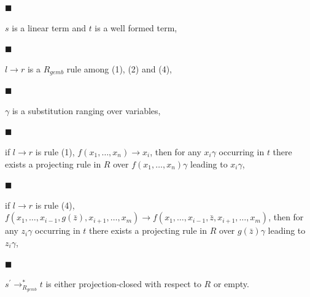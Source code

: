 \par\noindent  $\blacksquare$ 
 
$s$ is a linear term and $t$ is a well formed term,\par
 
 
 
\par\noindent  $\blacksquare$ 
 
$l\rightarrow r$ is a $R_{gemb}$ rule among (1), (2) and (4),\par
 
 
 
\par\noindent  $\blacksquare$ 
 
$\gamma$ is a substitution ranging over variables,\par
 
 
 
\par\noindent  $\blacksquare$ 
 
if $l\rightarrow r$ is rule (1), $f(x_{1},\ldots,x_{n})\rightarrow x_{i}$, then for any $x_{i}\gamma$ occurring in $t$ there exists a projecting rule in $R$ over $f(x_{1},\ldots,x_{n})\gamma$ leading to $x_{i}\gamma$,\par
 
 
 
\par\noindent  $\blacksquare$ 
 
if $l\rightarrow r$ is rule (4), $f(x_{1},\dots,x_{i-1},g(\bar{z}),x_{i+1},\dots,x_{m})\rightarrow f(x_{1},\dots%
,x_{i-1},\bar{z},x_{i+1},\dots,x_{m})$, then for any $z_{i}\gamma$ occurring in $t$ there exists a projecting rule in $R$ over $g(\bar{z})\gamma$ leading to $z_{i}\gamma$,\par
 
 
 
\par\noindent  $\blacksquare$ 
 
$s^{\prime}\rightarrow_{R_{gemb}}^{*}t$ is either projection-closed with respect to $R$ or empty.\par
 
 
  
 
 
 
